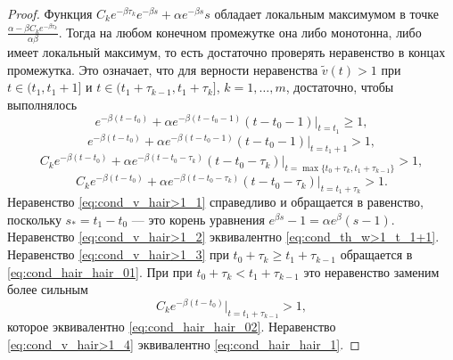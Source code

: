 \begin{proof}
	Функция $C_ke^{-\beta \tau_k}e^{-\beta s}+\alpha e^{-\beta s} s$ обладает локальным максимумом в точке $\frac{\alpha-\beta C_ke^{-\beta \tau_k}}{\alpha \beta}$.
	Тогда на любом конечном промежутке она либо монотонна, либо имеет локальный максимум, то есть достаточно проверять неравенство в концах промежутка. Это означает, что для верности неравенства $\tilde{v}(t)>1$ при $t\in(t_1,t_1+1]$ и  $t\in(t_1+\tau_{k-1},t_1+\tau_k]$, $k = 1,\ldots,m$,  достаточно, чтобы выполнялось  
	\begin{equation}
		\label{eq:cond_v_hair>1_1}
		e^{-\beta(t-t_0)}+\alpha e^{-\beta (t-t_0-1)} (t-t_0-1)|_{t=t_1}\geqslant 1,
	\end{equation}
	\begin{equation}
		\label{eq:cond_v_hair>1_2}
		e^{-\beta(t-t_0)}+\alpha e^{-\beta (t-t_0-1)} (t-t_0-1)|_{t=t_1+1}>1,
	\end{equation}
	\begin{equation}
		\label{eq:cond_v_hair>1_3}
		C_k e^{-\beta(t-t_0)}+\alpha e^{-\beta (t-t_0-\tau_k)} (t-t_0-\tau_k)|_{t=\max\{t_0+\tau_k,t_1+\tau_{k-1}\}}>1,
	\end{equation}
	\begin{equation}
		\label{eq:cond_v_hair>1_4}
		C_k e^{-\beta(t-t_0)}+\alpha e^{-\beta (t-t_0-\tau_k)} (t-t_0-\tau_k)|_{t=t_1+\tau_k}>1.
	\end{equation}
	Неравенство \eqref{eq:cond_v_hair>1_1} справедливо и обращается в равенство, поскольку $s_*=t_1-t_0$ --- это корень уравнения $e^{\beta s}-1=\alpha e^{\beta}(s-1)$. Неравенство \eqref{eq:cond_v_hair>1_2} эквивалентно \eqref{eq:cond_th_w>1_t_1+1}. Неравенство \eqref{eq:cond_v_hair>1_3} при $t_0+\tau_k\geqslant t_1+\tau_{k-1}$ обращается в \eqref{eq:cond_hair_hair_01}. При при $t_0+\tau_k<t_1+\tau_{k-1}$ это неравенство заменим более сильным
	\[C_ke^{-\beta(t-t_0)}|_{t=t_1+\tau_{k-1}}>1,\]
	которое эквивалентно \eqref{eq:cond_hair_hair_02}.
	Неравенство \eqref{eq:cond_v_hair>1_4} эквивалентно \eqref{eq:cond_hair_hair_1}.
	
\end{proof}

